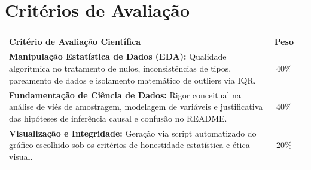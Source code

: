 \documentclass[12pt,a4paper]{article}
\begin{document}
	\section{Critérios de Avaliação}
	\begin{center}
		\begin{tabular}{p{11cm}cc}
			\toprule
			\textbf{Critério de Avaliação Científica} & \textbf{Peso} \\
			\midrule
			\textbf{Manipulação Estatística de Dados (EDA):} Qualidade algorítmica no tratamento de nulos, inconsistências de tipos, pareamento de dados e isolamento matemático de outliers via IQR. & 40\% \\
			\addlinespace
			\textbf{Fundamentação de Ciência de Dados:} Rigor conceitual na análise de viés de amostragem, modelagem de variáveis e justificativa das hipóteses de inferência causal e confusão no README. & 40\% \\
			\addlinespace
			\textbf{Visualização e Integridade:} Geração via script automatizado do gráfico escolhido sob os critérios de honestidade estatística e ética visual. & 20\% \\
			\bottomrule
		\end{tabular}
	\end{center}
	
\end{document}
